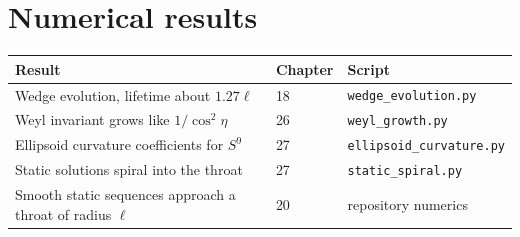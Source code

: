 \section*{Numerical results}
\begin{longtable}{@{}p{}p{}p{}@{}}
\toprule Result & Chapter & Script\\\midrule\endhead
Wedge evolution, lifetime about $1.27\ell$ & 18 & \texttt{wedge\_evolution.py}\\
Weyl invariant grows like $1/\cos^2\eta$ & 26 & \texttt{weyl\_growth.py}\\
Ellipsoid curvature coefficients for $S^9$ & 27 & \texttt{ellipsoid\_curvature.py}\\
Static solutions spiral into the throat & 27 & \texttt{static\_spiral.py}\\
Smooth static sequences approach a throat of radius $\ell$ & 20 & repository numerics\\
\bottomrule
\end{longtable}
